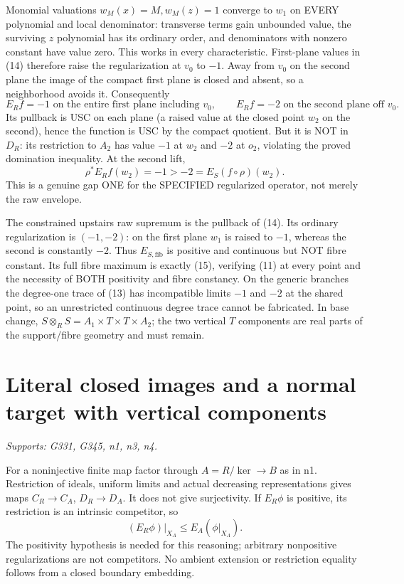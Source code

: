 \documentclass[11pt]{article}
\begin{document}
Monomial valuations $w_M(x)=M,w_M(z)=1$ converge to $w_1$ on EVERY polynomial and local denominator: transverse terms gain unbounded value, the surviving $z$ polynomial has its ordinary order, and denominators with nonzero constant have value zero. This works in every characteristic. First-plane values in (14) therefore raise the regularization at $v_0$ to $-1$. Away from $v_0$ on the second plane the image of the compact first plane is closed and absent, so a neighborhood avoids it. Consequently
\[
E_R f=-1\text{ on the entire first plane including }v_0,
\qquad E_R f=-2\text{ on the second plane off }v_0.    \tag{15}
\]
Its pullback is USC on each plane (a raised value at the closed point $w_2$ on the second), hence the function is USC by the compact quotient. But it is NOT in $D_R$: its restriction to $A_2$ has value $-1$ at $w_2$ and $-2$ at $o_2$, violating the proved domination inequality. At the second lift,
\[
\rho^*E_R f(w_2)=-1>-2=E_S(f\circ\rho)(w_2).          \tag{16}
\]
This is a genuine gap ONE for the SPECIFIED regularized operator, not merely the raw envelope.

The constrained upstairs raw supremum is the pullback of (14). Its ordinary regularization is $(-1,-2)$: on the first plane $w_1$ is raised to $-1$, whereas the second is constantly $-2$. Thus $E_{S,\mathrm{fib}}$ is positive and continuous but NOT fibre constant. Its full fibre maximum is exactly (15), verifying (11) at every point and the necessity of BOTH positivity and fibre constancy. On the generic branches the degree-one trace of (13) has incompatible limits $-1$ and $-2$ at the shared point, so an unrestricted continuous degree trace cannot be fabricated. In base change,
$S\otimes_R S=A_1\times T\times T\times A_2$;
the two vertical $T$ components are real parts of the support/fibre geometry and must remain.

\section{Literal closed images and a normal target with vertical components}
\textit{Supports: G331, G345, n1, n3, n4.}

For a noninjective finite map factor through $A=R/\ker\to B$ as in n1. Restriction of ideals, uniform limits and actual decreasing representations gives maps $C_R\to C_A$, $D_R\to D_A$. It does not give surjectivity. If $E_R\phi$ is positive, its restriction is an intrinsic competitor, so
\[
(E_R\phi)|_{X_A}\le E_A(\phi|_{X_A}).                 \tag{17}
\]
The positivity hypothesis is needed for this reasoning; arbitrary nonpositive regularizations are not competitors. No ambient extension or restriction equality follows from a closed boundary embedding.
\end{document}
